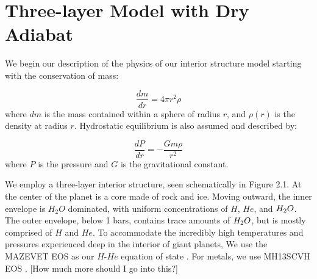 \documentclass[11pt]{ucscthesisbs}
\begin{document}
\section{Three-layer Model with Dry Adiabat}
\label{Three-layer Model with Dry Adiabat}
We begin our description of the physics of our interior structure model starting with the conservation of mass:

\begin{equation}
  \frac{dm}{dr} =4 \pi r^{2}\rho  
\end{equation}
where $dm$ is the mass contained within a sphere of radius $r$, and $\rho(r)$ is the density at radius $r$. Hydrostatic equilibrium is also assumed and described by:

\begin{equation}
  \frac{dP}{dr} = -\frac{Gm\rho}{r^{2}}  
\end{equation}
where $P$ is the pressure and $G$ is the gravitational constant. 

We employ a three-layer interior structure, seen schematically in Figure 2.1. At the center of the planet is a core made of rock and ice. Moving outward, the inner envelope is $H_{2}O$ dominated, with uniform concentrations of $H$, $He$, and $H_{\rm{2}}O$. The outer envelope, below 1 bars, contains trace amounts of $H_{\rm{2}}O$, but is mostly comprised of $H$ and $He$. To accommodate the incredibly high temperatures and pressures experienced deep in the interior of giant planets, We use the MAZEVET EOS as our $H$-$He$ equation of state \citep{mazevet_2019}. For metals, we use MH13SCVH EOS \citep{miguel_2018}. [How much more should I go into this?]
\end{document}

